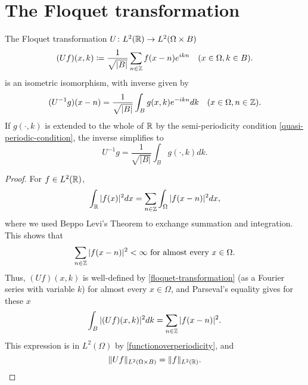 \section{The Floquet transformation} 	
\begin{theorem} \label{3.2:thm-UIsometricIsomorphism}
	The Floquet transformation $U \colon L^{2}(\mathbb{R}) \rightarrow L^{2}(\Omega \times B)$ 
	\begin{equation}
		(Uf)(x, k) \coloneqq \frac{1}{\sqrt{|B|}} \sum_{n \in \mathbb{Z}} f(x - n) e^{ikn} \quad (x \in \Omega, k \in B). \label{floquet-transformation}
	\end{equation}
	is an isometric isomorphism, with inverse given by
		\begin{equation}
			(U^{-1}g)(x - n) = \frac{1}{\sqrt{|B|}} \int_{B} g(x, k) e^{-ikn} dk \quad (x \in \Omega, n \in \mathbb{Z}). \label{3.8}
		\end{equation} 
	If $g(\cdot, k)$ is extended to the whole of $\mathbb{R}$ by the semi-periodicity condition \eqref{quasi-periodic-condition}, the inverse simplifies to
		\begin{equation}
			U^{-1} g = \frac{1}{\sqrt{|B|}} \int_{B} g(\cdot, k) dk. \label{3.9}
		\end{equation} %
		
	\begin{proof}
		For $f \in L^{2}(\mathbb{R})$,
		\begin{equation}
			\int_{\mathbb{R}} |f(x)|^{2} dx = \sum_{n \in \mathbb{Z}} \int_{\Omega} |f(x - n)|^{2} dx,\label{functionoverperiodicity}
		\end{equation} 
		where we used Beppo Levi's Theorem to exchange summation and integration. This shows that
		\[ \sum_{n \in \mathbb{Z}} |f(x - n)|^{2} < \infty \text{ for almost every } x \in \Omega.\]
		Thus, $(Uf)(x, k)$ is well-defined by \eqref{floquet-transformation} (as a Fourier series with variable $k$) for almost every $x \in \Omega$, and Parseval's equality gives for these $x$
		\[ \int_{B}|(Uf)(x,k)|^{2} dk = \sum_{n \in \mathbb{Z}} |f(x - n)|^{2}. \]
	 	This expression is in $L^{2}(\Omega)$ by \eqref{functionoverperiodicity}, and
		\[ \| Uf \|_{L^{2}(\Omega \times B)} = \|f\|_{L^{2}(\mathbb{R})}. \]
		

\end{proof}
\end{theorem}
